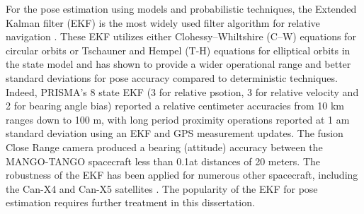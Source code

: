 For the pose estimation using models and probabilistic techniques, the Extended Kalman filter (EKF) is the most widely used filter algorithm for relative navigation \cite{dAmicoPrisma11,karlgaardAdaptiveEkf11}. These EKF utilizes either Clohessy–Whiltshire (C–W) equations \cite{CW} for circular orbits or Tschauner and Hempel (T-H) equations \cite{Tschauner65} for elliptical orbits in the state model and has shown to provide a wider operational range and better standard deviations for pose accuracy compared to deterministic techniques. Indeed, PRISMA's  8 state EKF (3 for relative psotion, 3 for relative velocity and 2 for bearing angle bias) reported a relative centimeter accuracies from  10 km ranges down to 100 m, with long period proximity operations reported at 1 am standard deviation \cite{bodinPrisma12} using an EKF and GPS measurement updates. The fusion Close Range camera produced a bearing (attitude) accuracy between the MANGO-TANGO spacecraft less than 0.1\textdegree at distances of 20 meters. The robustness of the EKF has been applied for numerous other spacecraft, including the Can-X4 and Can-X5 satellites \cite{boninCanX}. The popularity of the EKF for pose estimation requires further treatment in this dissertation. 





